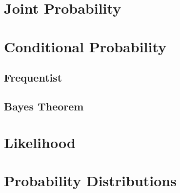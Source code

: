 \section{Joint Probability}
\label{sec:probability:joint_probability}












\section{Conditional Probability}
\label{sec:probability:cond_probability}












\subsection{Frequentist}
\label{sec:probability:cond_probability:frequentist}












\subsection{Bayes Theorem}
\label{sec:probability:cond_probability:bayes_theorem}












\section{Likelihood}
\label{sec:probability:likelihood}












\section{Probability Distributions}
\label{sec:probability:probability_distributions}












